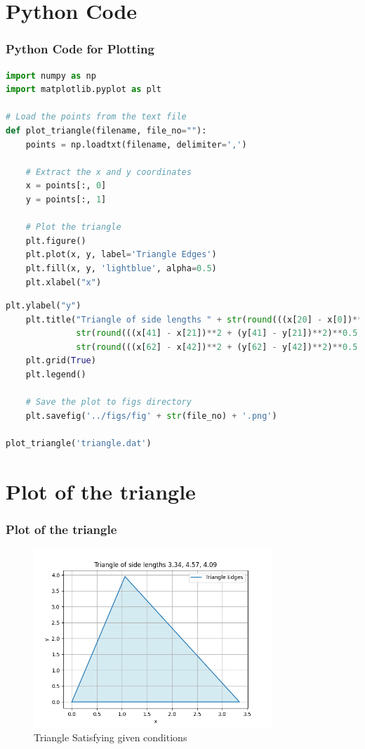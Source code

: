 \documentclass{beamer}
\theoremstyle{remark}
\providecommand{\norm}[1]{\lVert#1\rVert}
\numberwithin{equation}{section}
\begin{document}
\section{Python Code}
\begin{frame}[fragile]
\frametitle{Python Code for Plotting}
\begin{lstlisting}[language=Python]
import numpy as np
import matplotlib.pyplot as plt

# Load the points from the text file
def plot_triangle(filename, file_no=""):
    points = np.loadtxt(filename, delimiter=',')

    # Extract the x and y coordinates
    x = points[:, 0]
    y = points[:, 1]
    
    # Plot the triangle
    plt.figure()
    plt.plot(x, y, label='Triangle Edges')
    plt.fill(x, y, 'lightblue', alpha=0.5)
    plt.xlabel("x")
\end{lstlisting}
\end{frame}
\begin{frame}[fragile]
\begin{lstlisting}[language=Python]
    plt.ylabel("y")
    plt.title("Triangle of side lengths " + str(round(((x[20] - x[0])**2 + (y[20] - y[0])**2)**0.5, 2)) + ", " +
              str(round(((x[41] - x[21])**2 + (y[41] - y[21])**2)**0.5, 2)) + ", " +
              str(round(((x[62] - x[42])**2 + (y[62] - y[42])**2)**0.5, 2)))
    plt.grid(True)
    plt.legend()

    # Save the plot to figs directory
    plt.savefig('../figs/fig' + str(file_no) + '.png')

plot_triangle('triangle.dat')
\end{lstlisting}
\end{frame}
\section{Plot of the triangle}
\begin{frame}
\frametitle{Plot of the triangle}
\begin{figure}[H]
    \centering
	\includegraphics[width=0.8\textwidth]{figs/fig.png}
    \caption{Triangle Satisfying given conditions}
    \end{figure}   
%
\end{frame}
\end{document}
